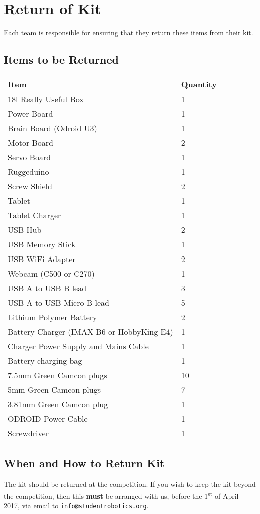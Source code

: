 \section {Return of Kit}
\label{sec:kit-return}

Each team is responsible for ensuring that they return these items from their kit.

\subsection {Items to be Returned}

\begin{tabular}{ll}
 \toprule
 \textbf{Item} & \textbf{Quantity} \\
 \midrule
 18l Really Useful Box & 1 \\

 Power Board & 1 \\
 Brain Board (Odroid U3) & 1 \\
 Motor Board & 2 \\
 Servo Board & 1 \\
 Ruggeduino & 1 \\
 Screw Shield & 2 \\

 Tablet & 1 \\
 Tablet Charger & 1 \\

 USB Hub & 2 \\
 USB Memory Stick & 1 \\
 USB WiFi Adapter & 2 \\
 Webcam (C500 or C270) & 1 \\
 USB A to USB B lead & 3 \\
 USB A to USB Micro-B lead & 5 \\

 Lithium Polymer Battery & 2 \\
 Battery Charger (IMAX B6 or HobbyKing E4) & 1 \\
 Charger Power Supply and Mains Cable & 1 \\
 Battery charging bag & 1 \\

 7.5mm Green Camcon plugs & 10 \\
 5mm Green Camcon plugs & 7 \\
 3.81mm Green Camcon plug & 1 \\
 ODROID Power Cable & 1 \\
 Screwdriver & 1 \\
 \bottomrule
\end{tabular}

\subsection {When and How to Return Kit}

The kit should be returned at the competition.
If you wish to keep the kit beyond the competition, then this \textbf{must} be arranged with us,
 before the 1\textsuperscript{st} of April 2017, via email to \href{mailto:info@studentrobotics.org}{\nolinkurl{info@studentrobotics.org}}.
